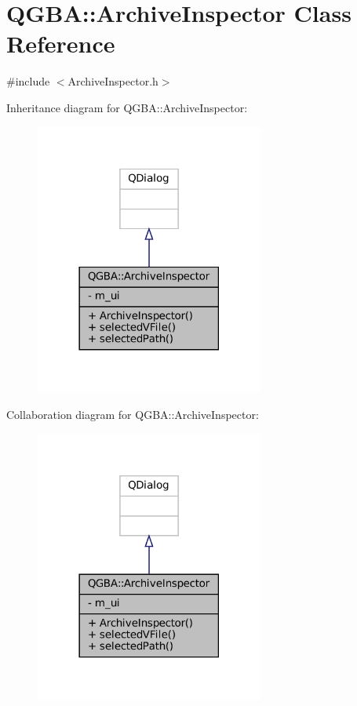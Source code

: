 \hypertarget{class_q_g_b_a_1_1_archive_inspector}{}\section{Q\+G\+BA\+:\+:Archive\+Inspector Class Reference}
\label{class_q_g_b_a_1_1_archive_inspector}


{\ttfamily \#include $<$Archive\+Inspector.\+h$>$}



Inheritance diagram for Q\+G\+BA\+:\+:Archive\+Inspector\+:
\nopagebreak
\begin{figure}[H]
\begin{center}
\leavevmode
\includegraphics[width=213pt]{class_q_g_b_a_1_1_archive_inspector__inherit__graph}
\end{center}
\end{figure}


Collaboration diagram for Q\+G\+BA\+:\+:Archive\+Inspector\+:
\nopagebreak
\begin{figure}[H]
\begin{center}
\leavevmode
\includegraphics[width=213pt]{class_q_g_b_a_1_1_archive_inspector__coll__graph}
\end{center}
\end{figure}
